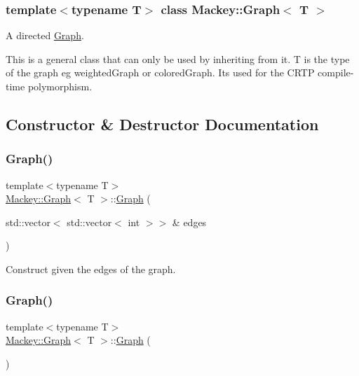 \subsubsection*{template$<$typename T$>$\newline
class Mackey\+::\+Graph$<$ T $>$}

A directed \hyperlink{classMackey_1_1Graph}{Graph}. 

This is a general class that can only be used by inheriting from it. T is the type of the graph eg weighted\+Graph or colored\+Graph. It\textquotesingle{}s used for the C\+R\+TP compile-\/time polymorphism. 

\subsection{Constructor \& Destructor Documentation}
\mbox{\label{classMackey_1_1Graph_a979aefd7d97cd0344637180c00e7db1b}} 
\subsubsection{\texorpdfstring{Graph()}{Graph()}\hspace{0.1cm}{\footnotesize\ttfamily [1/2]}}
{\footnotesize\ttfamily template$<$typename T$>$ \\
\hyperlink{classMackey_1_1Graph}{Mackey\+::\+Graph}$<$ T $>$\+::\hyperlink{classMackey_1_1Graph}{Graph} (\begin{DoxyParamCaption}\item[{std\+::vector$<$ std\+::vector$<$ int $>$$>$ \&}]{edges }\end{DoxyParamCaption})\hspace{0.3cm}{\ttfamily [inline]}}



Construct given the edges of the graph. 

\mbox{\label{classMackey_1_1Graph_a910e6687de1a1a90df5b656e3c850a01}} 
\subsubsection{\texorpdfstring{Graph()}{Graph()}\hspace{0.1cm}{\footnotesize\ttfamily [2/2]}}
{\footnotesize\ttfamily template$<$typename T$>$ \\
\hyperlink{classMackey_1_1Graph}{Mackey\+::\+Graph}$<$ T $>$\+::\hyperlink{classMackey_1_1Graph}{Graph} (\begin{DoxyParamCaption}{ }\end{DoxyParamCaption})\hspace{0.3cm}{\ttfamily [inline]}}




